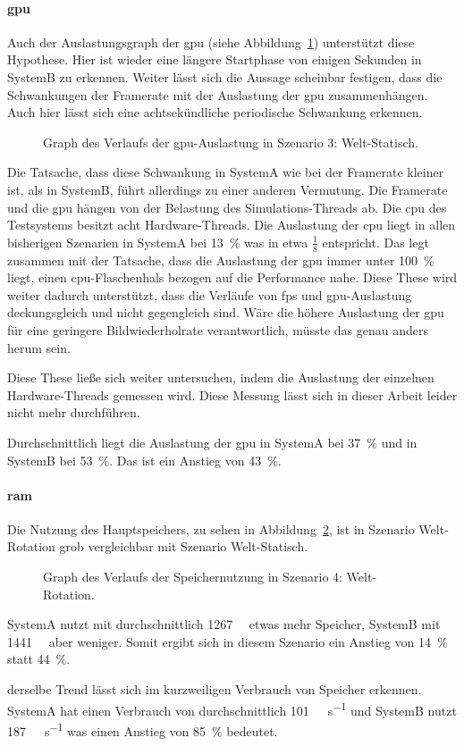 \paragraph{\ac{gpu}}
Auch der Auslastungsgraph der \ac{gpu} (siehe Abbildung~\ref{fig:seed-0-rotate-gpu}) unterstützt diese Hypothese. Hier ist wieder eine längere Startphase von einigen Sekunden in SystemB zu erkennen. Weiter lässt sich die Aussage scheinbar festigen, dass die Schwankungen der Framerate mit der Auslastung der \ac{gpu} zusammenhängen. Auch hier lässt sich eine achtsekündliche periodische Schwankung erkennen.
\begin{figure}[!htbp]
	\caption[Graph des Verlaufs der -Auslastung in Szenario 4: Welt-Rotation.]{Graph des Verlaufs der \ac{gpu}-Auslastung in Szenario 3: Welt-Statisch.}\label{fig:seed-0-rotate-gpu}
\end{figure}
Die Tatsache, dass diese Schwankung in SystemA wie bei der Framerate kleiner ist, als in SystemB, führt allerdings zu einer anderen Vermutung. Die Framerate und die \ac{gpu} hängen von der Belastung des Simulations-Threads ab. Die \ac{cpu} des Testsystems besitzt acht Hardware-Threads. Die Auslastung der \ac{cpu} liegt in allen bisherigen Szenarien in SystemA bei \SI{13}{\percent} was in etwa $\frac{1}{8}$ entspricht. Das legt zusammen mit der Tatsache, dass die Auslastung der \ac{gpu} immer unter \SI{100}{\percent} liegt, einen \ac{cpu}-Flaschenhals bezogen auf die Performance nahe. Diese These wird weiter dadurch unterstützt, dass die Verläufe von \ac{fps} und \ac{gpu}-Auslastung deckungsgleich und nicht gegengleich sind. Wäre die höhere Auslastung der \ac{gpu} für eine geringere Bildwiederholrate verantwortlich, müsste das genau anders herum sein.

Diese These ließe sich weiter untersuchen, indem die Auslastung der einzelnen Hardware-Threads gemessen wird. Diese Messung lässt sich in dieser Arbeit leider nicht mehr durchführen. 

Durchschnittlich liegt die Auslastung der \ac{gpu} in SystemA bei \SI{37}{\percent} und in SystemB bei \SI{53}{\percent}. Das ist ein Anstieg von \SI{43}{\percent}.

\paragraph{\ac{ram}}
Die Nutzung des Hauptspeichers, zu sehen in Abbildung~\ref{fig:seed-0-rotate-mem}, ist in Szenario Welt-Rotation grob vergleichbar mit Szenario Welt-Statisch.
\begin{figure}[!htbp]
	\caption{Graph des Verlaufs der Speichernutzung in Szenario 4: Welt-Rotation.}\label{fig:seed-0-rotate-mem}	
\end{figure} 
SystemA nutzt mit durchschnittlich \SI{1267}{\mega\byte} etwas mehr Speicher, SystemB mit \SI{1441}{\mega\byte} aber weniger. Somit ergibt sich in diesem Szenario ein Anstieg von \SI{14}{\percent} statt \SI{44}{\percent}. 

derselbe Trend lässt sich im kurzweiligen Verbrauch von Speicher erkennen. SystemA hat einen Verbrauch von durchschnittlich \SI{101}{\mega\byte\per\second} und SystemB nutzt \SI{187}{\mega\byte\per\second} was einen Anstieg von \SI{85}{\percent} bedeutet.
